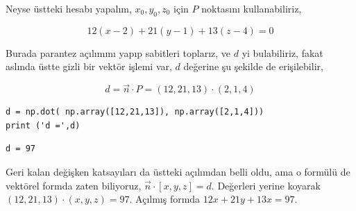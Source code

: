 \documentclass[12pt,fleqn]{article}\usepackage{../../common}
\begin{document}
Neyse üstteki hesabı yapalım, $x_0,y_0,z_0$ için $P$ noktasını kullanabiliriz,

$$
12(x-2) + 21(y-1) + 13(z-4) = 0
$$

Burada parantez açılımını yapıp sabitleri toplarız, ve $d$ yi bulabiliriz, fakat
aslında üstte gizli bir vektör işlemi var, $d$ değerine şu şekilde de erişilebilir,

$$
d = \vec{n} \cdot P = (12,21,13) \cdot (2,1,4)
$$

\begin{verbatim}
d = np.dot( np.array([12,21,13]), np.array([2,1,4]))
print ('d =',d)
\end{verbatim}

\begin{verbatim}
d = 97
\end{verbatim}

Geri kalan değişken katsayıları da üstteki açılımdan belli oldu, ama o formülü
de vektörel formda zaten biliyoruz, $\vec{n} \cdot [x,y,z] = d$. Değerleri
yerine koyarak $(12,21,13) \cdot (x,y,z) = 97 $. Açılmış formda
$12x + 21y + 13x = 97$.
\end{document}
